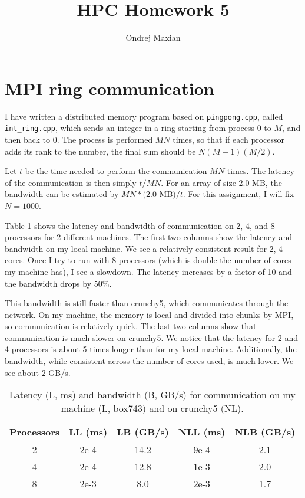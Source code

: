 \documentclass[a4paper]{article}
\title{HPC Homework 5}
\author{Ondrej Maxian}
\begin{document}
\maketitle
\section{MPI ring communication}
I have written a distributed memory program based on \texttt{pingpong.cpp}, called \texttt{int\_ring.cpp}, which sends an integer in a ring starting from process 0 to $M$, and then back to 0. The process is performed $MN$ times, so that if each processor adds its rank to the number, the final sum should be $N(M-1)(M/2)$.

Let $t$ be the time needed to perform the communication $MN$ times. The latency of the communication is then simply $t/MN$. For an array of size 2.0 MB, the bandwidth can be estimated by $MN*(2.0$ MB$)/t$. For this assignment, I will fix $N=1000$. 

Table \ref{tab:t} shows the latency and bandwidth of communication on 2, 4, and 8 processors for 2 different machines. The first two columns show the latency and bandwidth on my local machine. We see a relatively consistent result for 2, 4 cores. Once I try to run with 8 processors (which is double the number of cores my machine has), I see a slowdown. The latency increases by a factor of 10 and the bandwidth drops by 50\%. 

This bandwidth is still faster than crunchy5, which communicates through the network. On my machine, the memory is local and divided into chunks by MPI, so communication is relatively quick. The last two columns show that communication is much slower on crunchy5. We notice that the latency for 2 and 4 processors is about 5 times longer than for my local machine. Additionally, the bandwidth, while consistent across the number of cores used, is much lower. We see about 2 GB/s. 

\begin{table}[ht]
\centering
\begin{tabular}{c|c|c|c|c}
Processors & LL (ms) & LB (GB/s) & NLL (ms) & NLB (GB/s)\\[2 pt] \hline
2 & 2e-4 & 14.2 & 9e-4  & 2.1\\[2 pt]
4 & 2e-4 & 12.8 & 1e-3 & 2.0 \\[2 pt]
8 & 2e-3 & 8.0 & 2e-3 & 1.7
\end{tabular}
\caption{Latency (L, ms) and bandwidth (B, GB/s) for communication on my machine (L, box743) and on crunchy5 (NL). }
\label{tab:t}
\end{table}
\end{document}
